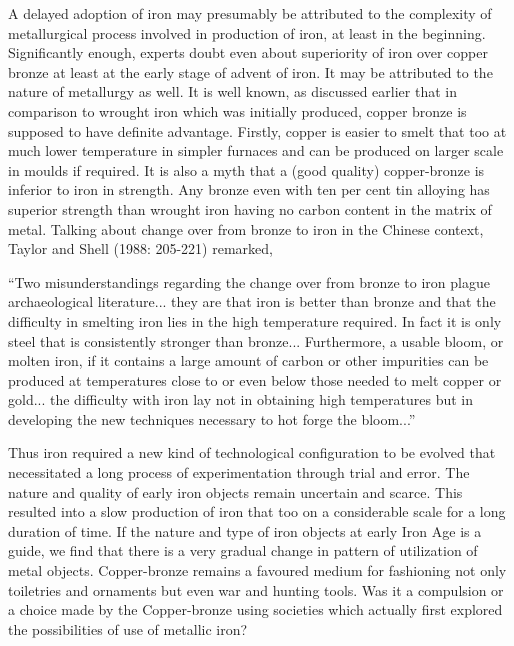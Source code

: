{A delayed adoption of iron may presumably be attributed to the complexity of metallurgical process involved in production of iron, at least in the beginning. Significantly enough, experts doubt even about superiority of iron over copper bronze at least at the early stage of advent of iron. It may be attributed to the nature of metallurgy as well. It is well known, as discussed earlier that in comparison to wrought iron which was initially produced, copper bronze is supposed to have definite advantage. Firstly, copper is easier to smelt that too at much lower temperature in simpler furnaces and can be produced on larger scale in moulds if required. It is also a myth that a (good quality) copper-bronze is inferior to iron in strength. Any bronze even with ten per cent tin alloying has superior strength than wrought iron having no carbon content in the matrix of metal. Talking about change over from bronze to iron in the Chinese context, Taylor and Shell (1988: 205-221) remarked, 

{\footnotesize “Two misunderstandings regarding the change over from bronze to iron plague archaeological literature... they are that iron is better than bronze and that the difficulty in smelting iron lies in the high temperature required. In fact it is only steel that is consistently stronger than bronze... Furthermore, a usable bloom, or molten iron, if it contains a large amount of carbon or other impurities can be produced at temperatures close to or even below those needed to melt copper or gold... the difficulty with iron lay not in obtaining high temperatures but in developing the new techniques necessary to hot forge the bloom...” }

Thus iron required a new kind of technological configuration to be evolved that necessitated a long process of experimentation through trial and error. The nature and quality of early iron objects remain uncertain and scarce. This resulted into a slow production of iron that too on a considerable scale for a long duration of time. If the nature and type of iron objects at early Iron Age is a guide, we find that there is a very gradual change in pattern of utilization of metal objects. Copper-bronze remains a favoured medium for fashioning not only toiletries and ornaments but even war and hunting tools. Was it a compulsion or a choice made by the Copper-bronze using societies which actually first explored the possibilities of use of metallic iron?

\newpage

}
